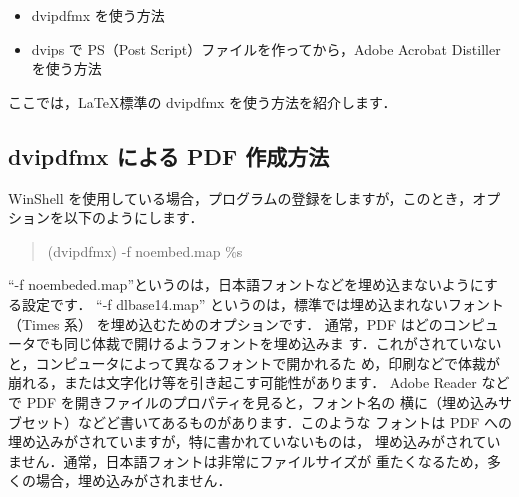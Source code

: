 \documentclass[a4paper, 10pt, dvips, fleqn, uplatex]{jsarticle}
\begin{document}
\begin{itemize}

\item dvipdfmx を使う方法

\item dvips で PS（Post Script）ファイルを作ってから，Adobe Acrobat
Distillerを使う方法

\end{itemize}

ここでは，\LaTeX 標準の dvipdfmx を使う方法を紹介します．

\subsection{dvipdfmx による PDF 作成方法}

WinShell を使用している場合，プログラムの登録をしますが，このとき，オプ
ションを以下のようにします．

\begin{quote}
 (dvipdfmx) -f noembed.map \%s
\end{quote}

``-f noembeded.map''というのは，日本語フォントなどを埋め込まないようにす
る設定です．
``-f dlbase14.map'' というのは，標準では埋め込まれないフォント（Times 系）
を埋め込むためのオプションです．
通常，PDF はどのコンピュータでも同じ体裁で開けるようフォントを埋め込みま
す．これがされていないと，コンピュータによって異なるフォントで開かれるた
め，印刷などで体裁が崩れる，または文字化け等を引き起こす可能性があります．
Adobe Reader などで PDF を開きファイルのプロパティを見ると，フォント名の
横に（埋め込みサブセット）などど書いてあるものがあります．このような
フォントは PDF への埋め込みがされていますが，特に書かれていないものは，
埋め込みがされていません．通常，日本語フォントは非常にファイルサイズが
重たくなるため，多くの場合，埋め込みがされません．
\end{document}
